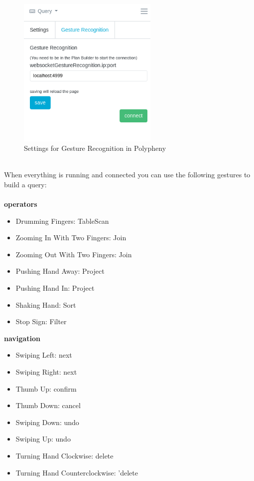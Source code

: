 \begin{figure}[H]
    \centering
    \includegraphics[width=0.6\textwidth]{reportContent/images/settings_s.png}
    \caption{Settings for Gesture Recognition in Polypheny}
    \label{fig:settings}
\end{figure}{}
\\
When everything is running and connected you can use the following  gestures to build a query:
\\
\\
\textbf{operators}
\begin{itemize}
    \item Drumming Fingers: TableScan
    \item Zooming In With Two Fingers: Join
    \item Zooming Out With Two Fingers: Join
    \item Pushing Hand Away: Project
    \item Pushing Hand In: Project
    \item Shaking Hand: Sort
    \item Stop Sign: Filter
\end{itemize}
\textbf{navigation}
\begin{itemize}
    \item Swiping Left: next
    \item Swiping Right: next
    \item Thumb Up: confirm
    \item Thumb Down: cancel
    \item Swiping Down: undo
    \item Swiping Up: undo
    \item Turning Hand Clockwise: delete
    \item Turning Hand Counterclockwise: 'delete
\end{itemize}
